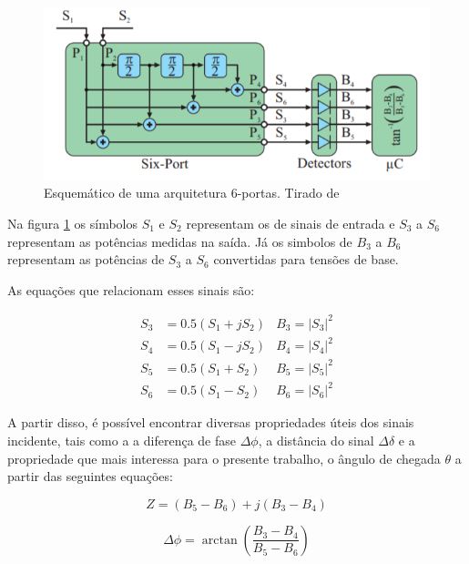 \begin{figure}[H]
	\centering 
	\includegraphics[scale = 1]{images/six_port_schematic.png}
	\caption{Esquemático de uma arquitetura 6-portas. Tirado de \cite{art14} }
	\label{fig:six_port_schematic}
\end{figure}

Na figura \ref{fig:six_port_schematic} os símbolos \( S_1 \) e \( S_2 \) representam os de sinais de entrada e \( S_3 \) a \( S_6 \) representam as potências medidas na saída. Já os simbolos de \( B_3 \) a \( B_6 \) representam as potências de \( S_3 \) a \( S_6 \) convertidas para tensões de base.

As equações que relacionam esses sinais são:

\begin{align*}
    S_3 & = 0.5(S_1 + jS_2) & B_3 = \left | S_3 \right | ^2\\
    S_4 & = 0.5(S_1 - jS_2) & B_4 = \left | S_4 \right | ^2\\
    S_5 & = 0.5(S_1 + S_2)  & B_5 = \left | S_5 \right | ^2\\
    S_6 & = 0.5(S_1 - S_2)  & B_6 = \left | S_6 \right | ^2
\end{align*}

A partir disso, é possível encontrar diversas propriedades úteis dos sinais incidente, tais como a a diferença de fase \( \Delta\phi\), a distância do sinal \( \Delta\delta\) e a propriedade que mais interessa para o presente trabalho, o ângulo de chegada \(\theta\) a partir das seguintes equações:

\begin{equation}
    Z = (B_5 - B_6) + j(B_3 - B_4)
    \end{equation}

\begin{equation}
    \Delta \phi = \arctan \left ( \frac{B_3-B_4}{B_5-B_6} \right )
    \end{equation}

